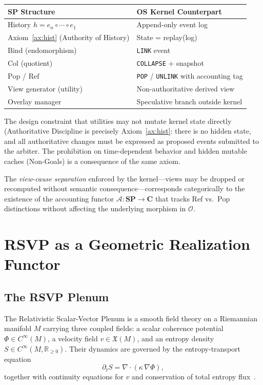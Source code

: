 \documentclass[12pt, a4paper]{article}
\theoremstyle{definition}
\theoremstyle{remark}
\newcommand{\Rnn}{\mathbb{R}_{\ge 0}}
\newcommand{\SP}{\mathbf{SP}}
\newcommand{\catO}{\mathcal{O}}
\newcommand{\Pop}{\mathrm{Pop}}
\newcommand{\Refuse}{\mathrm{Ref}}
\newcommand{\Bind}{\mathrm{Bind}}
\newcommand{\Collapse}{\mathrm{Col}}
\begin{document}
\begin{center}
\renewcommand{\arraystretch}{1.4}
\begin{tabular}{ll}
\toprule
\textbf{$\SP$ Structure} & \textbf{OS Kernel Counterpart} \\
\midrule
History $h = e_n \circ \cdots \circ e_1$ & Append-only event log \\
Axiom~\ref{ax:hist} (Authority of History) & State = replay(log) \\
$\Bind$ (endomorphism) & \texttt{LINK} event \\
$\Collapse$ (quotient) & \texttt{COLLAPSE} + snapshot \\
$\Pop$ / $\Refuse$ & \texttt{POP} / \texttt{UNLINK} with accounting tag \\
View generator (utility) & Non-authoritative derived view \\
Overlay manager & Speculative branch outside kernel \\
\bottomrule
\end{tabular}
\end{center}

The design constraint that utilities may not mutate kernel state directly (Authoritative
Discipline is precisely Axiom~\ref{ax:hist}:
there is no hidden state, and all authoritative changes must be expressed as proposed
events submitted to the arbiter. The prohibition on time-dependent behavior and hidden
mutable caches (Non-Goals) is a consequence of the same axiom.

The \emph{view-cause separation} enforced by the kernel—views may be dropped or
recomputed without semantic consequence—corresponds categorically to the existence of
the accounting functor $\mathcal{A} : \SP \to \mathbf{C}$ that tracks $\Refuse$ vs.\
$\Pop$ distinctions without affecting the underlying morphism in $\catO$.

\section{RSVP as a Geometric Realization Functor}
\label{sec:functor}

\subsection{The RSVP Plenum}

The Relativistic Scalar-Vector Plenum is a smooth field
theory on a Riemannian manifold $M$ carrying three coupled fields: a scalar coherence
potential $\Phi \in C^\infty(M)$, a velocity field $v \in \mathfrak{X}(M)$, and an
entropy density $S \in C^\infty(M, \Rnn)$. Their dynamics are governed by the
entropy-transport equation
\begin{equation}
  \partial_t S = \nabla \cdot (\kappa\,\nabla\Phi),
  \label{eq:rsvp-pde}
\end{equation}
together with continuity equations for $v$ and conservation of total entropy
flux~\citep{jacobson1995, verlinde2011}.
\end{document}
